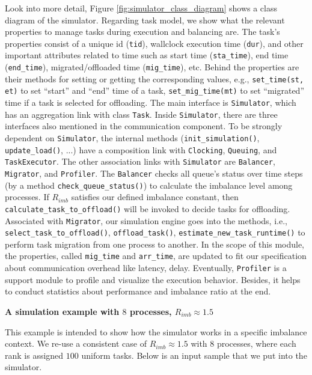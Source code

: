 Look into more detail, Figure \ref{fig:simulator_class_diagram} shows a class diagram of the simulator. Regarding task model, we show what the relevant properties to manage tasks during execution and balancing are. The task's properties consist of a unique id (\texttt{tid}), wallclock execution time (\texttt{dur}), and other important attributes related to time such as start time (\texttt{sta\_time}), end time (\texttt{end\_time}), migrated/offloaded time (\texttt{mig\_time}), etc. Behind the properties are their methods for setting or getting the corresponding values, e.g., \texttt{set\_time(st, et)} to set ``start'' and ``end'' time of a task, \texttt{set\_mig\_time(mt)} to set ``migrated'' time if a task is selected for offloading. The main interface is \texttt{Simulator}, which has an aggregation link with class \texttt{Task}. Inside \texttt{Simulator}, there are three interfaces also mentioned in the communication component. To be strongly dependent on \texttt{Simulator}, the internal methods (\texttt{init\_simulation()}, \texttt{update\_load()}, ...) have a composition link with \texttt{Clocking}, \texttt{Queuing}, and \texttt{TaskExecutor}. The other association links with \texttt{Simulator} are \texttt{Balancer}, \texttt{Migrator}, and \texttt{Profiler}. The \texttt{Balancer} checks all queue's status over time steps (by a method \texttt{check\_queue\_status()}) to calculate the imbalance level among processes. If $R_{imb}$ satisfies our defined imbalance constant, then \texttt{calculate\_task\_to\_offload()} will be invoked to decide tasks for offloading. Associated with \texttt{Migrator}, our simulation engine goes into the methods, i.e., \texttt{select\_task\_to\_offload()}, \texttt{offload\_task()}, \texttt{estimate\_new\_task\_runtime()} to perform task migration from one process to another. In the scope of this module, the properties, called \texttt{mig\_time} and \texttt{arr\_time}, are updated to fit our specification about communication overhead like latency, delay. Eventually, \texttt{Profiler} is a support module to profile and visualize the execution behavior. Besides, it helps to conduct statistics about performance and imbalance ratio at the end.

\begin{shaded}
	\noindent \textbf{A simulation example with $8$ processes, $R_{imb} \approx 1.5$}
\end{shaded}

\noindent This example is intended to show how the simulator works in a specific imbalance context. We re-use a consistent case of $R_{imb} \approx 1.5$ with $8$ processes, where each rank is assigned $100$ uniform tasks. Below is an input sample that we put into the simulator.

